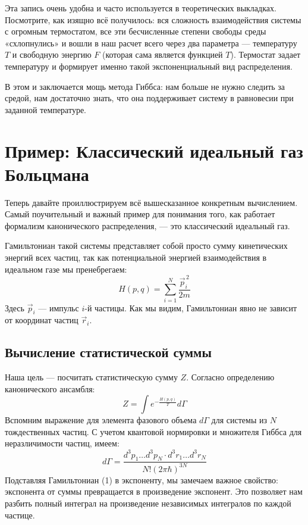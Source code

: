 \documentclass[../general/general]{subfiles}
\begin{document}
Эта запись очень удобна и часто используется в теоретических выкладках. Посмотрите, как изящно всё получилось: вся сложность взаимодействия системы с огромным термостатом, все эти бесчисленные степени свободы среды «схлопнулись» и вошли в наш расчет всего через два параметра — температуру $T$ и свободную энергию $F$ (которая сама является функцией $T$). Термостат задает температуру и формирует именно такой экспоненциальный вид распределения.

В этом и заключается мощь метода Гиббса: нам больше не нужно следить за средой, нам достаточно знать, что она поддерживает систему в равновесии при заданной температуре.

\section{Пример: Классический идеальный газ Больцмана}

Теперь давайте проиллюстрируем всё вышесказанное конкретным вычислением. Самый поучительный и важный пример для понимания того, как работает формализм канонического распределения, — это классический идеальный газ. 

Гамильтониан такой системы представляет собой просто сумму кинетических энергий всех частиц, так как потенциальной энергией взаимодействия в идеальном газе мы пренебрегаем:
\begin{equation}
H(p, q) = \sum_{i=1}^{N} \frac{\vec{p}_i^{\,2}}{2m}
\end{equation}
Здесь $\vec{p}_i$ — импульс $i$-й частицы. Как мы видим, Гамильтониан явно не зависит от координат частиц $\vec{r}_i$.

\subsection{Вычисление статистической суммы}

Наша цель — посчитать статистическую сумму $Z$. Согласно определению канонического ансамбля:
\begin{equation}
Z = \int e^{-\frac{H(p, q)}{T}} d\Gamma
\end{equation}
Вспомним выражение для элемента фазового объема $d\Gamma$ для системы из $N$ тождественных частиц. С учетом квантовой нормировки и множителя Гиббса для неразличимости частиц, имеем:
\begin{equation}
d\Gamma = \frac{d^3p_1 \dots d^3p_N \cdot d^3r_1 \dots d^3r_N}{N! (2\pi\hbar)^{3N}}
\end{equation}
Подставляя Гамильтониан (1) в экспоненту, мы замечаем важное свойство: экспонента от суммы превращается в произведение экспонент. Это позволяет нам разбить полный интеграл на произведение независимых интегралов по каждой частице.
\end{document}
